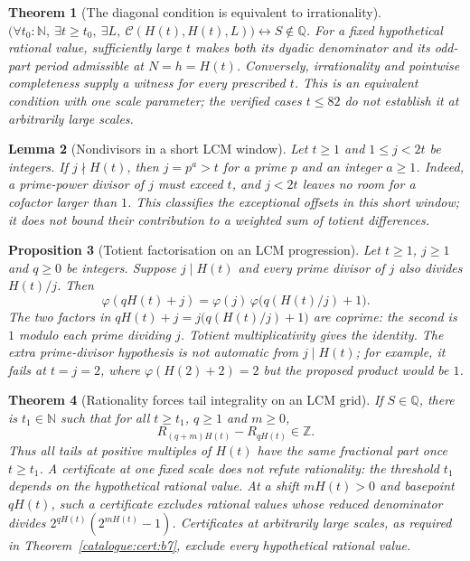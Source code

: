 \documentclass[11pt]{article}
\theoremstyle{plain}
\newtheorem{thm}{Theorem}[section]
\newtheorem{lem}[thm]{Lemma}
\newtheorem{prop}[thm]{Proposition}
\theoremstyle{definition}
\theoremstyle{remark}
\begin{document}
\begin{thm}[The diagonal condition is equivalent to irrationality]\label{catalogue:cert:b3}
$\big(\forall t_0:\mathbb{N},\ \exists t\ge t_0,\ \exists L,\ \mathcal{C}({H}(t), {H}(t), L)\big) \leftrightarrow S\notin\mathbb Q$. For a fixed hypothetical rational value, sufficiently large $t$ makes both its dyadic denominator and its odd-part period admissible at $N=h={H}(t)$. Conversely, irrationality and pointwise completeness supply a witness for every prescribed $t$. This is an equivalent condition with one scale parameter; the verified cases $t\le82$ do not establish it at arbitrarily large scales.
\end{thm}

\begin{lem}[Nondivisors in a short LCM window]\label{catalogue:cert:b4}
Let $t\ge1$ and $1\le j<2t$ be integers. If $j\nmid H(t)$, then
$j=p^a>t$ for a prime $p$ and an integer $a\ge1$. Indeed, a prime-power
divisor of $j$ must exceed $t$, and $j<2t$ leaves no room for a
cofactor larger than $1$. This classifies the exceptional offsets in
this short window; it does not bound their contribution to a weighted
sum of totient differences.

\end{lem}

\begin{prop}[Totient factorisation on an LCM progression]\label{catalogue:cert:b5}
Let $t\ge1$, $j\ge1$ and $q\ge0$ be integers. Suppose $j\mid H(t)$
and every prime divisor of $j$ also divides $H(t)/j$. Then
\[
 \varphi(qH(t)+j)=\varphi(j)\,
                 \varphi\bigl(q(H(t)/j)+1\bigr).
\]
The two factors in $qH(t)+j=j\bigl(q(H(t)/j)+1\bigr)$ are coprime:
the second is $1$ modulo each prime dividing $j$. Totient
multiplicativity gives the identity. The extra prime-divisor hypothesis
is not automatic from $j\mid H(t)$; for example, it fails at $t=j=2$,
where $\varphi(H(2)+2)=2$ but the proposed product would be $1$.

\end{prop}

\begin{thm}[Rationality forces tail integrality on an LCM grid]\label{catalogue:cert:b6}
If $S\in\mathbb Q$, there is $t_1\in\mathbb N$ such that for all
$t\ge t_1$, $q\ge1$ and $m\ge0$,
\[
 R_{(q+m)H(t)}-R_{qH(t)}\in\mathbb Z.
\]
Thus all tails at positive multiples of $H(t)$ have the same fractional
part once $t\ge t_1$. A certificate at one fixed scale does not refute
rationality: the threshold $t_1$ depends on the hypothetical rational
value. At a shift $mH(t)>0$ and basepoint $qH(t)$, such a certificate
excludes rational values whose reduced denominator divides
$2^{qH(t)}(2^{mH(t)}-1)$. Certificates at arbitrarily large scales,
as required in Theorem~\ref{catalogue:cert:b7}, exclude every hypothetical
rational value.

\end{thm}
\end{document}
